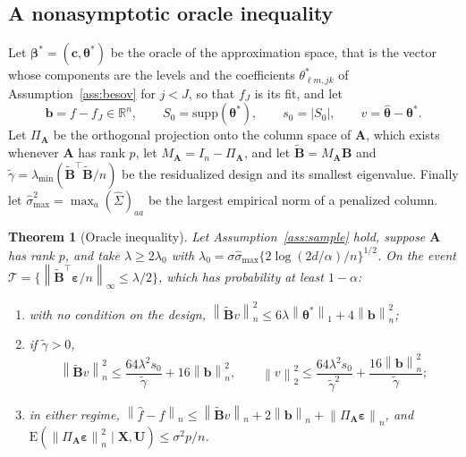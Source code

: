 \documentclass[12pt]{article} %
\newtheorem{theorem}{Theorem}
\theoremstyle{definition}
\newcommand{\R}{\mathbb{R}}
\newcommand{\E}{\mathrm{E}}
\newcommand{\T}{^{\top}}
\newcommand{\norm}[1]{\left\lVert #1 \right\rVert}
\newcommand{\normn}[1]{\left\lVert #1 \right\rVert_{n}}
\newcommand{\cv}{\ell}
\newcommand{\md}{m}
\newcommand{\lev}{j}
\newcommand{\tsl}{k}
\newcommand{\bX}{\mathbf{X}}
\newcommand{\bU}{\mathbf{U}}
\newcommand{\coefs}[4]{\theta^{*}_{#1#2,#3#4}}
\newcommand{\btheta}{\boldsymbol{\theta}}
\newcommand{\thetastar}{\btheta^{*}}
\newcommand{\thetahat}{\widehat{\btheta}}
\newcommand{\bbeta}{\boldsymbol{\beta}}
\newcommand{\betastar}{\bbeta^{*}}
\newcommand{\bc}{\mathbf{c}}
\newcommand{\Gramhat}{\widehat{\Sigma}}
\newcommand{\pen}{\lambda}
\newcommand{\Szero}{S_{0}}
\newcommand{\Amat}{\mathbf{A}}
\newcommand{\Bmat}{\mathbf{B}}
\newcommand{\Btil}{\widetilde{\Bmat}}
\newcommand{\PA}{\Pi_{\Amat}}
\newcommand{\MA}{M_{\Amat}}
\newcommand{\bveps}{\boldsymbol{\varepsilon}}
\newcommand{\bb}{\mathbf{b}}
\newcommand{\smax}{\widehat{\sigma}_{\max}}
\newcommand{\gtil}{\widetilde{\gamma}}
\newcommand{\lmin}{\lambda_{\min}}
\begin{document}
\subsection{A nonasymptotic oracle inequality}
\label{sec:oracle}

Let $\betastar = (\bc,\thetastar)$ be the \textcolor{colR1}{oracle of the approximation space}, that is the vector
whose components are the levels and the coefficients
$\coefs{\cv}{\md}{\lev}{\tsl}$ of Assumption~\ref{ass:besov} for $\lev < J$,
so that $f_J$ is its fit, and let
\[
  \bb = f - f_J \in \R^{n}, \qquad \Szero = \mathrm{supp}(\thetastar),
  \qquad s_0 = |\Szero|, \qquad v = \thetahat - \thetastar .
\]
Let $\PA$ be the orthogonal projection onto the column space of $\Amat$, which
exists whenever $\Amat$ has rank $p$, let $\MA = I_n - \PA$, and let
$\Btil = \MA\Bmat$ and $\gtil = \lmin(\Btil\T\Btil/n)$ be the residualized
design and its smallest eigenvalue. Finally let
$\smax^{2} = \max_a (\Gramhat)_{aa}$ be the largest empirical norm of a
penalized column.

\begin{theorem}[Oracle inequality]
\label{thm:oracle}
Let Assumption~\ref{ass:sample} hold, suppose $\Amat$ has rank $p$, and take
$\pen \ge 2\pen_0$ with
$\pen_0 = \sigma\smax\{2\log(2d/\alpha)/n\}^{1/2}$. On the event
$\mathcal{T} = \{\norm{\Btil\T\bveps/n}_{\infty} \le \pen/2\}$, which has
probability at least $1 - \alpha$:
\begin{enumerate}
\item[(i)] with no condition on the design,
$\normn{\Btil v}^{2} \le 6\pen\norm{\thetastar}_{1} + 4\normn{\bb}^{2}$;
\item[(ii)] if $\gtil > 0$,
\[
  \normn{\Btil v}^{2} \le \frac{64\pen^{2}s_0}{\gtil} + 16\normn{\bb}^{2},
  \qquad
  \norm{v}_{2}^{2} \le \frac{64\pen^{2}s_0}{\gtil^{2}}
  + \frac{16\normn{\bb}^{2}}{\gtil} ;
\]
\item[(iii)] in either regime,
$\normn{\widehat{f}-f} \le \normn{\Btil v} + 2\normn{\bb}
+ \normn{\PA\bveps}$, and
$\E(\normn{\PA\bveps}^{2}\mid\bX,\bU) \le \sigma^{2}p/n$.
\end{enumerate}
\end{theorem}
\end{document}
